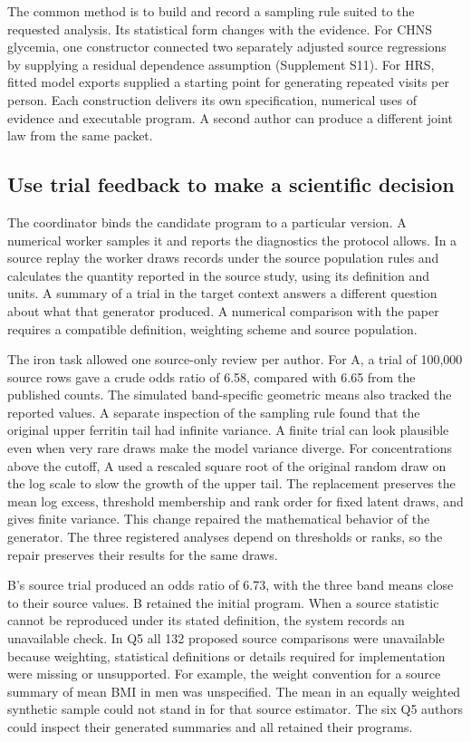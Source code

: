 \documentclass[11pt,letterpaper]{article}
\begin{document}
The common method is to build and record a sampling rule suited to the requested analysis. Its statistical form changes with the evidence. For CHNS glycemia, one constructor connected two separately adjusted source regressions by supplying a residual dependence assumption (Supplement S11). For HRS, fitted model exports supplied a starting point for generating repeated visits per person. Each construction delivers its own specification, numerical uses of evidence and executable program. A second author can produce a different joint law from the same packet.


\subsection{Use trial feedback to make a scientific decision}

The coordinator binds the candidate program to a particular version. A numerical worker samples it and reports the diagnostics the protocol allows. In a source replay the worker draws records under the source population rules and calculates the quantity reported in the source study, using its definition and units. A summary of a trial in the target context answers a different question about what that generator produced. A numerical comparison with the paper requires a compatible definition, weighting scheme and source population.


The iron task allowed one source-only review per author. For A, a trial of 100,000 source rows gave a crude odds ratio of 6.58, compared with 6.65 from the published counts. The simulated band-specific geometric means also tracked the reported values. A separate inspection of the sampling rule found that the original upper ferritin tail had infinite variance. A finite trial can look plausible even when very rare draws make the model variance diverge. For concentrations above the cutoff, A used a rescaled square root of the original random draw on the log scale to slow the growth of the upper tail. The replacement preserves the mean log excess, threshold membership and rank order for fixed latent draws, and gives finite variance. This change repaired the mathematical behavior of the generator. The three registered analyses depend on thresholds or ranks, so the repair preserves their results for the same draws.


B's source trial produced an odds ratio of 6.73, with the three band means close to their source values. B retained the initial program. When a source statistic cannot be reproduced under its stated definition, the system records an unavailable check. In Q5 all 132 proposed source comparisons were unavailable because weighting, statistical definitions or details required for implementation were missing or unsupported. For example, the weight convention for a source summary of mean BMI in men was unspecified. The mean in an equally weighted synthetic sample could not stand in for that source estimator. The six Q5 authors could inspect their generated summaries and all retained their programs.
\end{document}
